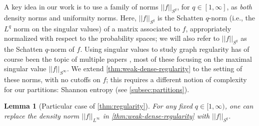 \documentclass[reqno,11pt]{amsart}
\newtheorem{lemma}[theorem]{Lemma}
\theoremstyle{definition}
\theoremstyle{remark}
\numberwithin{equation}{section}
\newcommand{\E}{\mathbf{E}}
\newcommand{\mP}{\mathcal{P}}
\newcommand{\mQ}{\mathcal{Q}}
\newcommand{\one}{\mathbbm{1}}
\begin{document}

A key idea in our work is to use a family of norms $||f||_{S^q}$, for $q \in [1, \infty]$, as \emph{both} density norms and uniformity norms. Here, $||f||_{S^q}$ is the Schatten $q$-norm (i.e., the $L^q$ norm on the singular values) of a matrix associated to $f$, appropriately normalized with respect to the probability spaces; we will also refer to $||f||_{S^q}$ as the Schatten $q$-norm of $f$. Using singular values to study graph regularity has of course been the topic of multiple papers \cite{frieze1999simple,fox2019fast,szegedy2011limits,bodwin2022unified,nikiforov2012extremal}, most of these focusing on the maximal singular value $||f||_{S^\infty}$. We extend \cref{thm:weak-dense-regularity} to the setting of these norms, with no cutoffs on $f$; this requires a different notion of complexity for our partitions: Shannon entropy (see \cref{subsec:partitions}). %

\iffalse
\begin{lemma}[Particular case of \cref{thm:regularity}] \label{lem:regularity-1}
For any fixed $q \in [1, \infty)$, one can replace the density norm $||f||_{L^\infty}$ in \cref{thm:weak-dense-regularity} with $||f||_{S^q}$.
\end{lemma}
\end{document}
